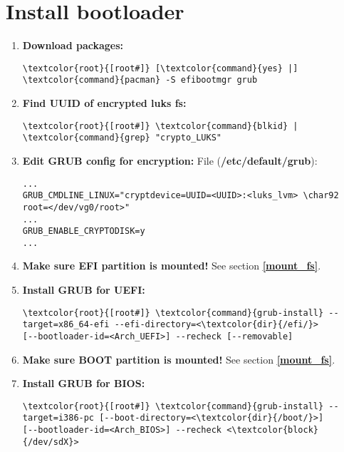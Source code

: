 \documentclass[10pt, a4paper, onecolumn, openany]{book} %
\begin{document}
\section{Install bootloader}
\begin{enumerate}
    \item \textbf{Download packages:}
\begin{Verbatim}[commandchars=\\\{\}]
\textcolor{root}{[root#]} [\textcolor{command}{yes} |] \textcolor{command}{pacman} -S efibootmgr grub
\end{Verbatim}

    \item \textbf{Find UUID of encrypted luks fs:}
\begin{Verbatim}[commandchars=\\\{\}]
\textcolor{root}{[root#]} \textcolor{command}{blkid} | \textcolor{command}{grep} "crypto_LUKS"
\end{Verbatim}    

    \item \textbf{Edit GRUB config for encryption:}
\newline File (\textbf{\textcolor{file}{/etc/default/grub}}):
\begin{Verbatim}[commandchars=\\\{\}]
...
GRUB_CMDLINE_LINUX="cryptdevice=UUID=<UUID>:<luks_lvm> \char92 
root=</dev/vg0/root>"
...
GRUB_ENABLE_CRYPTODISK=y
...
\end{Verbatim}

    \item \textbf{Make sure EFI partition is mounted!}
\newline See section \underline{\textbf{\ref{mount_fs}}}.

    \item \textbf{Install GRUB for UEFI:}
\begin{Verbatim}[commandchars=\\\{\}]
\textcolor{root}{[root#]} \textcolor{command}{grub-install} --target=x86_64-efi --efi-directory=<\textcolor{dir}{/efi/}> 
[--bootloader-id=<Arch_UEFI>] --recheck [--removable]
\end{Verbatim}

    \item \textbf{Make sure BOOT partition is mounted!}
\newline See section \underline{\textbf{\ref{mount_fs}}}.

    \item \textbf{Install GRUB for BIOS:}
\begin{Verbatim}[commandchars=\\\{\}]
\textcolor{root}{[root#]} \textcolor{command}{grub-install} --target=i386-pc [--boot-directory=<\textcolor{dir}{/boot/}>] 
[--bootloader-id=<Arch_BIOS>] --recheck <\textcolor{block}{/dev/sdX}>
\end{Verbatim}


\end{enumerate}
\end{document}

